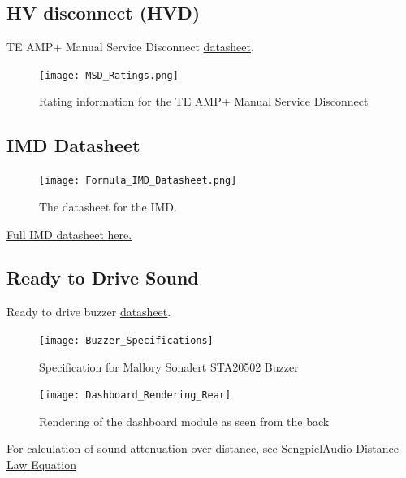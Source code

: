 \documentclass{article}
\begin{document}
\subsection{HV disconnect (HVD)}\label{sec:appendix_hvd}
TE AMP+ Manual Service Disconnect \href{http://www.te.com/content/dam/te-com/documents/hybrid-and-electric-mobility-solutions/global/8-1773462-2-msd.pdf}{datasheet}.

\begin{figure}[H]
	\texttt{[image: MSD\_Ratings.png]}
	\caption{Rating information for the TE AMP+ Manual Service Disconnect}
\end{figure}

\subsection{IMD Datasheet}\label{IMD_datasheet}

\begin{figure} [!ht]
	\centering  %
	
	\texttt{[image: Formula\_IMD\_Datasheet.png]}
	
	\caption{The datasheet for the IMD.}
	
	\label{fig:IMD_Datasheet}
\end{figure}

\href{http://www.bender-us.com/documents/IR155-10_datasheet_NAE1012821.pdf}{Full IMD datasheet here.}

\setcounter{subsection}{11}
\subsection{Ready to Drive Sound}\label{Ready to Drive}
Ready to drive buzzer \href{http://www.mallory-sonalert.com/specifications/STA20502.PDF}{datasheet}. \newline
\begin{figure}[H]
	\texttt{[image: Buzzer\_Specifications]}
	\caption{Specification for Mallory Sonalert STA20502 Buzzer}
\end{figure}

\begin{figure}[H]
	\texttt{[image: Dashboard\_Rendering\_Rear]}
	\caption{Rendering of the dashboard module as seen from the back} 
    \label{fig:dashboard_Render}
\end{figure}

For calculation of sound attenuation over distance, see \href{http://www.sengpielaudio.com/calculator-distance.htm}{SengpielAudio Distance Law Equation}
\end{document}

